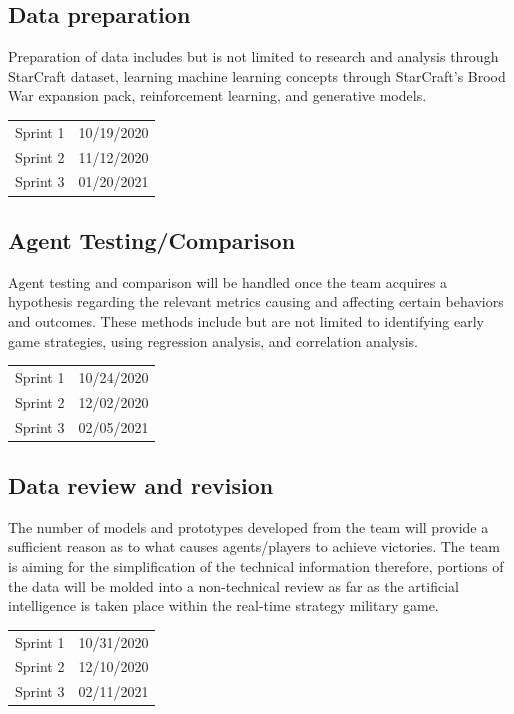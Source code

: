\documentclass[a4paper,12pt]{report}
\begin{document}
\subsection{Data preparation}

Preparation of data includes but is not limited to research and analysis through StarCraft dataset, learning machine learning concepts through StarCraft’s Brood War expansion pack, reinforcement learning, and generative models.

\begin{center}\begin{tabular}{ll}
Sprint 1 & 10/19/2020 \\
Sprint 2 & 11/12/2020 \\
Sprint 3 & 01/20/2021
\end{tabular}\end{center}

\subsection{Agent Testing/Comparison}

Agent testing and comparison will be handled once the team acquires a hypothesis regarding the relevant metrics causing and affecting certain behaviors and outcomes. These methods include but are not limited to identifying early game strategies, using regression analysis, and correlation analysis.


\begin{center}\begin{tabular}{ll}
Sprint 1 & 10/24/2020 \\
Sprint 2 & 12/02/2020 \\
Sprint 3 & 02/05/2021
\end{tabular}\end{center}

\subsection{Data review and revision}

The number of models and prototypes developed from the team will provide a sufficient reason as to what causes agents/players to achieve victories. The team is aiming for the simplification of the technical information therefore, portions of the data will be molded into a non-technical review as far as the artificial intelligence is taken place within the real-time strategy military game.

\begin{center}\begin{tabular}{ll}
Sprint 1 & 10/31/2020 \\
Sprint 2 & 12/10/2020 \\
Sprint 3 & 02/11/2021
\end{tabular}\end{center}
\end{document}
